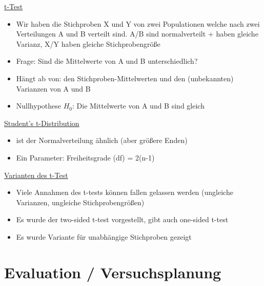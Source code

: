 \documentclass[a4paper,10pt,oneside]{article}
\begin{document}
\underline{t-Test} \\
 	\begin{itemize}
 		\item Wir haben die Stichproben X und Y von zwei Populationen welche nach zwei Verteilungen A und B verteilt sind. A/B sind normalverteilt + haben gleiche Varianz, X/Y haben gleiche Stichprobengröße
 		\item Frage: Sind die Mittelwerte von A und B unterschiedlich?
 		\item Hängt ab von: den Stichproben-Mittelwerten und den (unbekannten) Varianzen von A und B
 		\item Nullhypothese $H_0$: Die Mittelwerte von A und B sind gleich
 	\end{itemize}
 	
\underline{Student's t-Distribution} \\
 	\begin{itemize}
 		\item ist der Normalverteilung ähnlich (aber größere Enden)
 		\item Ein Parameter: Freiheitsgrade (df) = 2(n-1)
 	\end{itemize}
 		
\underline{Varianten des t-Test} \\
 	\begin{itemize}
 		\item Viele Annahmen des t-tests können fallen gelassen werden (ungleiche Varianzen, ungleiche Stichprobengrößen)
 		\item Es wurde der two-sided t-test vorgestellt, gibt auch one-sided t-test
 		\item Es wurde Variante für unabhängige Stichproben gezeigt
 	\end{itemize}

\section{Evaluation / Versuchsplanung}	
\end{document}
